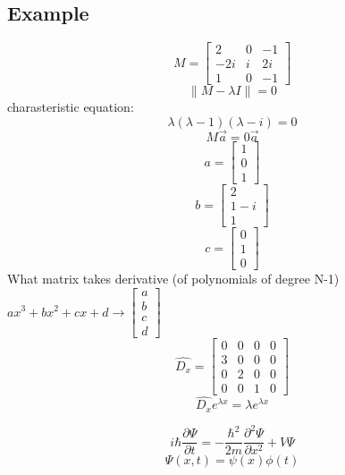 \documentclass[12pt, a4paper]{article}
\begin{document}
\subsection{Example}
$$M=
\begin{bmatrix}
2 & 0 & -1\\
-2i & i & 2i\\
1 & 0 & -1
\end{bmatrix}$$
$$\|M-\lambda I\|=0$$
charasteristic equation:
$$\lambda(\lambda - 1)(\lambda - i)=0$$
$$M\vec{a}=0\vec{a}$$
$$a=\begin{bmatrix}
1\\0\\1
\end{bmatrix}$$
$$b=\begin{bmatrix}
2\\1-i\\1
\end{bmatrix}$$
$$c=\begin{bmatrix}
0\\1\\0
\end{bmatrix}$$
What matrix takes derivative (of polynomials of degree N-1)\\
$ax^3+bx^2+cx+d\rightarrow \begin{bmatrix}
a\\b\\c\\d
\end{bmatrix}$
$$
\hat{D_x}=
\begin{bmatrix}
0 & 0 & 0 & 0\\
3 & 0 & 0 & 0\\
0 & 2 & 0 & 0\\
0 & 0 & 1 & 0
\end{bmatrix}
$$
$$\hat{D_x}e^{\lambda x}= \lambda e^{\lambda x}$$

$$i\hbar \frac{\partial \Psi}{\partial t}=-\frac{\hbar^2}{2m}\frac{\partial ^2\Psi}{\partial x^2}+V\Psi$$
$$\Psi(x,t)= \psi(x)\phi(t)$$
\end{document}
